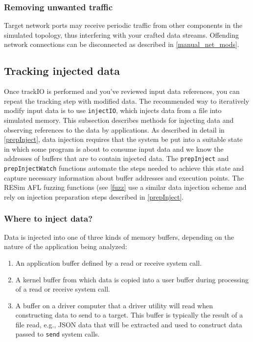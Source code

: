 \documentclass[titlepage]{article}
\begin{document}
\subsubsection{Removing unwanted traffic}
Target network ports may receive periodic traffic from other components in the simulated topology, thus interfering with your crafted data streams.
Offending network connections can be disconnected as described in \ref{manual_net_mods}.

\subsection{Tracking injected data}
\label{tracking-injected-data}
Once trackIO is performed and you've reviewed input data references, you can repeat the tracking step with modified data.
The recommended way to iteratively modify input data is to use  {\tt injectIO}, which injects data from a file into simulated memory.
This subsection describes methods for injecting data and observing references to the data by applications.
As described in detail in \ref{prepInject}, data injection requires that the system be put into a suitable
state in which some program is about to consume input data and we know the addresses of buffers that are to contain injected data.
The {\tt prepInject} and {\tt prepInjectWatch} functions automate the steps needed to achieve this state and capture necessary information 
about buffer addresses and execution points.    
The RESim AFL fuzzing functions (see \ref{fuzz} use a similar data injection scheme and rely on injection preparation steps described in \ref{prepInject}.

\subsubsection{Where to inject data?}
\label{where-to-inject}
Data is injected into one of three kinds of memory buffers, depending on the nature of the application being analyzed:
\begin{enumerate}
\item An application buffer defined by a read or receive system call.
\item A kernel buffer from which data is copied into a user buffer during processing of a read or receive system call.
\item A buffer on a driver computer that a driver utility will read when constructing data to send to a target.
This buffer is typically the result of a file read, e.g., JSON data that will be extracted and used to construct 
data passed to {\tt send} system calls.
\end{enumerate}
\end{document}
